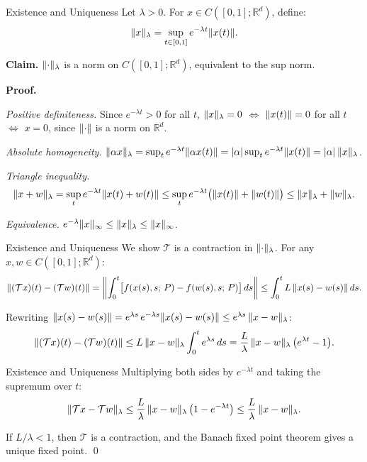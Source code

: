 \documentclass[aspectratio=169]{beamer}
\newcommand{\R}{\mathbb{R}}
\DeclarePairedDelimiter{\norm}{\lVert}{\rVert}
\begin{document}
\begin{frame}{Existence and Uniqueness}
Let $\lambda > 0$. For $x \in C([0,1]; \R^d)$, define:
\[
\norm{x}_\lambda = \sup_{t \in [0,1]} e^{-\lambda t}\norm{x(t)}.
\]

\textbf{Claim.} $\norm{\cdot}_\lambda$ is a norm on $C([0,1]; \R^d)$, equivalent to the sup norm.

\bigskip
\textbf{Proof.}

\emph{Positive definiteness.} Since $e^{-\lambda t} > 0$ for all $t$, $\norm{x}_\lambda = 0$ $\iff$ $\norm{x(t)} = 0$ for all $t$ $\iff$ $x = 0$, since $\norm{\cdot}$ is a norm on $\R^d$.

\emph{Absolute homogeneity.} $\norm{\alpha x}_\lambda = \sup_t e^{-\lambda t}\norm{\alpha x(t)} = |\alpha|\sup_t e^{-\lambda t}\norm{x(t)} = |\alpha|\,\norm{x}_\lambda$.

\emph{Triangle inequality.}
\[
\norm{x + w}_\lambda = \sup_t e^{-\lambda t}\norm{x(t) + w(t)} \leq \sup_t e^{-\lambda t}\bigl(\norm{x(t)} + \norm{w(t)}\bigr) \leq \norm{x}_\lambda + \norm{w}_\lambda.
\]

\emph{Equivalence.} $e^{-\lambda}\norm{x}_\infty \leq \norm{x}_\lambda \leq \norm{x}_\infty$.
\end{frame}

\begin{frame}{Existence and Uniqueness}
We show $\mathcal{T}$ is a contraction in $\norm{\cdot}_\lambda$. For any $x, w \in C([0,1]; \R^d)$:
\[
\norm{(\mathcal{T}x)(t) - (\mathcal{T}w)(t)} = \norm*{\int_0^t \bigl[f(x(s), s;\,P) - f(w(s), s;\,P)\bigr]\,ds} \leq \int_0^t L\,\norm{x(s) - w(s)}\,ds.
\]

Rewriting $\norm{x(s) - w(s)} = e^{\lambda s}\,e^{-\lambda s}\norm{x(s) - w(s)} \leq e^{\lambda s}\,\norm{x - w}_\lambda$:
\[
\norm{(\mathcal{T}x)(t) - (\mathcal{T}w)(t)} \leq L\,\norm{x - w}_\lambda \int_0^t e^{\lambda s}\,ds = \frac{L}{\lambda}\,\norm{x - w}_\lambda\,\bigl(e^{\lambda t} - 1\bigr).
\]
\end{frame}

\begin{frame}{Existence and Uniqueness}
Multiplying both sides by $e^{-\lambda t}$ and taking the supremum over $t$:
\[
\norm{\mathcal{T}x - \mathcal{T}w}_\lambda \leq \frac{L}{\lambda}\,\norm{x - w}_\lambda\,\bigl(1 - e^{-\lambda t}\bigr) \leq \frac{L}{\lambda}\,\norm{x - w}_\lambda.
\]

\bigskip
If $L/\lambda < 1$, then $\mathcal{T}$ is a contraction, and the Banach fixed point theorem gives a unique fixed point. \qed
\end{frame}
\end{document}
